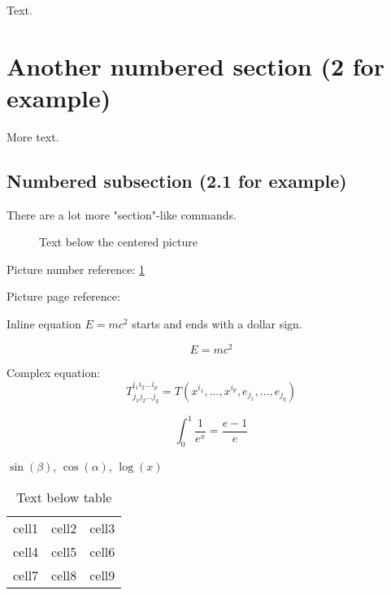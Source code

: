 \documentclass[12pt, a4paper]{article} %
\begin{document}
Text.

\section{Another numbered section (2 for example)}

More text.
 
\subsection{Numbered subsection (2.1 for example)}

There are a lot more "section"-like commands.



\begin{figure}[H] %
    \centering
    \caption{Text below the centered picture}
    \label{fig:mozilla_picture_label}
\end{figure}
 
Picture number reference: \ref{fig:mozilla_picture_label}

Picture page reference: \pageref{fig:mozilla_picture_label} 



Inline equation $E=mc^2$ starts and ends with a dollar sign.

\begin{equation} %
E=mc^2
\end{equation}

Complex equation:
$$T^{i_1 i_2 \dots i_p}_{j_1 j_2 \dots j_q} = T(x^{i_1},\dots,x^{i_p},e_{j_1},\dots,e_{j_q})$$

$$\int_0^1 \frac{1}{e^x} =  \frac{e-1}{e}$$

$\sin(\beta)$, $\cos(\alpha)$, $\log(x)$



\begin{center}

\begin{table}[H] %
\centering

\begin{tabular}{ |l|c|r| } %
\hline                     %
cell1 & cell2 & cell3 \\   %
cell4 & cell5 & cell6 \\  
cell7 & cell8 & cell9 \\
\hline                     %
\end{tabular}

\caption{Text below table}
\label{table:sample_table_label}
\end{table}

\end{center}
\end{document}
